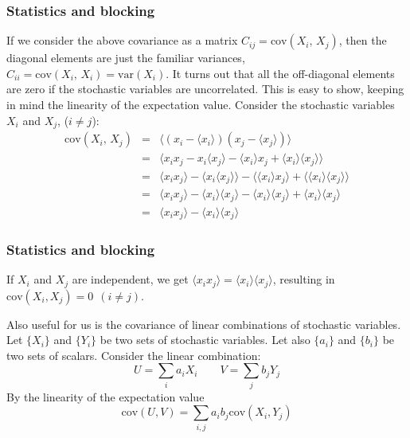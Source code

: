 \documentclass{beamer}
\begin{document}
\begin{frame}
\frametitle{Statistics and blocking}

\begin{block}{}
If we consider the above covariance as a matrix $C_{ij}=\mathrm{cov}(X_i,\,X_j)$, then the diagonal elements are just the familiar
variances, $C_{ii} = \mathrm{cov}(X_i,\,X_i) = \mathrm{var}(X_i)$. It turns out that
all the off-diagonal elements are zero if the stochastic variables are
uncorrelated. This is easy to show, keeping in mind the linearity of
the expectation value. Consider the stochastic variables $X_i$ and
$X_j$, ($i\neq j$):
\begin{eqnarray}
\mathrm{cov}(X_i,\,X_j) &=& \langle(x_i-\langle x_i\rangle)(x_j-\langle x_j\rangle)\rangle\\
&=&\langle x_i x_j - x_i\langle x_j\rangle - \langle x_i\rangle x_j + \langle x_i\rangle\langle x_j\rangle\rangle \\
&=&\langle x_i x_j\rangle - \langle x_i\langle x_j\rangle\rangle - \langle \langle x_i\rangle x_j\rangle +
\langle \langle x_i\rangle\langle x_j\rangle\rangle\\
&=&\langle x_i x_j\rangle - \langle x_i\rangle\langle x_j\rangle - \langle x_i\rangle\langle x_j\rangle +
\langle x_i\rangle\langle x_j\rangle\\
&=&\langle x_i x_j\rangle - \langle x_i\rangle\langle x_j\rangle
\end{eqnarray}
\end{block}
\end{frame}

\begin{frame}
\frametitle{Statistics and blocking}

\begin{block}{}
If $X_i$ and $X_j$ are independent, we get 
$\langle x_i x_j\rangle =\langle x_i\rangle\langle x_j\rangle$, resulting in $\mathrm{cov}(X_i, X_j) = 0\ \ (i\neq j)$.

Also useful for us is the covariance of linear combinations of
stochastic variables. Let $\{X_i\}$ and $\{Y_i\}$ be two sets of
stochastic variables. Let also $\{a_i\}$ and $\{b_i\}$ be two sets of
scalars. Consider the linear combination:
\[
U = \sum_i a_i X_i \qquad V = \sum_j b_j Y_j
\]
By the linearity of the expectation value
\[
\mathrm{cov}(U, V) = \sum_{i,j}a_i b_j \mathrm{cov}(X_i, Y_j)
\]
\end{block}
\end{frame}
\end{document}
